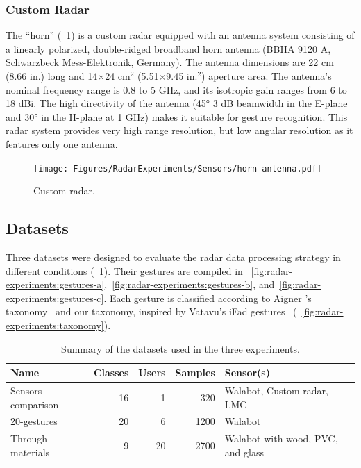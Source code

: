\subsubsection{Custom Radar}
The ``horn'' (\fig~\ref{fig:radar-experiments:horn}) is a custom radar equipped with an antenna system consisting of a linearly polarized, double-ridged broadband horn antenna (BBHA 9120 A, Schwarzbeck Mess-Elektronik, Germany). The antenna dimensions are 22 cm (8.66 in.) long and 14$\times$24 cm$^2$ (5.51$\times$9.45 in.$^2$) aperture area. The antenna's nominal frequency range is 0.8 to 5 GHz, and its isotropic gain ranges from 6 to 18 dBi. The high directivity of the antenna (45° 3 dB beamwidth in the E-plane and 30° in the H-plane at 1 GHz) makes it suitable for gesture recognition.
This radar system provides very high range resolution, but low angular resolution as it features only one antenna.

\begin{figure}[tb]
    \centering
    \texttt{[image: Figures/RadarExperiments/Sensors/horn-antenna.pdf]}
    \caption{Custom radar.}
    \label{fig:radar-experiments:horn}
\end{figure}


\subsection{Datasets} \label{sec:radar-experiments:data-collection:datasets}
Three datasets were designed to evaluate the radar data processing strategy in different conditions (\tab~\ref{tab:radar-experiments:datasets-summary}). Their gestures are compiled in \fig~\ref{fig:radar-experiments:gestures-a},~\ref{fig:radar-experiments:gestures-b}, and~\ref{fig:radar-experiments:gestures-c}. Each gesture is classified according to Aigner \etal's taxonomy~\cite{Aigner:2012} and our taxonomy, inspired by Vatavu's iFad gestures~\cite{Vatavu:2023b} (\fig~\ref{fig:radar-experiments:taxonomy}).

\begin{table}
    \footnotesize
    \centering
    \begin{tabular}{lrrrp{4.6cm}}
        \toprule
        \textbf{Name} & \textbf{Classes} & \textbf{Users} & \textbf{Samples} & \textbf{Sensor(s)} \\
        \midrule
        Sensors comparison & 16 & 1 & 320 & Walabot, Custom radar, LMC\\
        20-gestures & 20 & 6 & 1200 & Walabot \\
        Through-materials & 9 & 20 & 2700 & Walabot with wood, PVC, and glass \\
        \bottomrule
    \end{tabular}
    \caption{Summary of the datasets used in the three experiments.}
    \label{tab:radar-experiments:datasets-summary}
\end{table}

